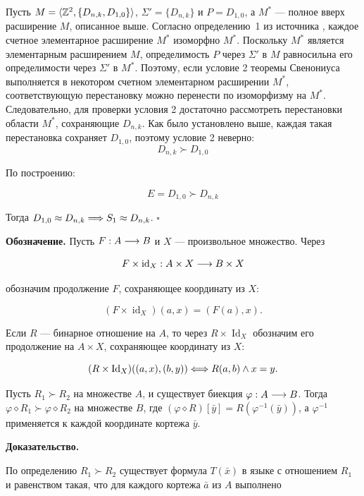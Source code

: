 Пусть $M = \langle \mathbb{Z}^2, \{D_{n,k}, D_{1, 0}\} \rangle$, $\Sigma' = \{D_{n,k}\}$ и $P = D_{1, 0}$, а $M^*$ --- полное вверх расширение $M$, описанное выше. Согласно определению~1 из источника \cite{Upward_Complete_Structures_Semenov_Soprunov}, каждое счетное элементарное расширение $M^*$ изоморфно $M^*$. Поскольку $M^*$ является элементарным расширением $M$, определимость $P$ через $\Sigma'$ в $M$ равносильна его определимости через $\Sigma'$ в $M^*$. Поэтому, если условие 2 теоремы Свенониуса выполняется в некотором счетном элементарном расширении $M^*$, соответствующую перестановку можно перенести по изоморфизму на $M^*$. Следовательно, для проверки условия 2 достаточно рассмотреть перестановки области $M^*$, сохраняющие $D_{n,k}$. Как было установлено выше, каждая такая перестановка сохраняет $D_{1,0}$, поэтому условие 2 неверно:
$$D_{n,k} \succ D_{1, 0}$$

По построению: 

$$E = D_{1, 0} \succ D_{n,k}$$

Тогда $D_{1, 0} \approx D_{n,k} \Longrightarrow S_1 \approx D_{n,k}$. \hfill $\square$
\bs

\textbf{Обозначение.}
Пусть $F:A\longrightarrow B$ и $X$ --- произвольное множество. Через

$$F\times\operatorname{id}_X:A\times X\longrightarrow B\times X$$

обозначим продолжение $F$, сохраняющее координату из $X$:

$$(F\times\operatorname{id}_X)(a,x)=(F(a),x).$$

Если $R$ --- бинарное отношение на $A$, то через $R\times\operatorname{Id}_X$ обозначим его продолжение на $A\times X$, сохраняющее координату из $X$:

$$(R\times\operatorname{Id}_X)((a,x),(b,y)) \Longleftrightarrow R(a,b)\wedge x=y.$$

\begin{namedLemma}
    \label{lemm:Definability_Transition}
    Пусть $R_1 \succ R_2$ на множестве $A$, и существует биекция $\varphi: A \longrightarrow B$. Тогда $\varphi \diamond R_1 \succ \varphi \diamond R_2$ на множестве $B$, где $(\varphi \diamond R)[\bar{y}] = R(\varphi^{-1}(\bar{y}))$, а $\varphi^{-1}$ применяется к каждой координате кортежа $\bar{y}$.
\end{namedLemma}

\textbf{Доказательство.}

    По определению $R_1 \succ R_2$ существует формула $T(\bar{x})$ в языке с отношением $R_1$ и равенством такая, что для каждого кортежа $\bar{a}$ из $A$ выполнено

